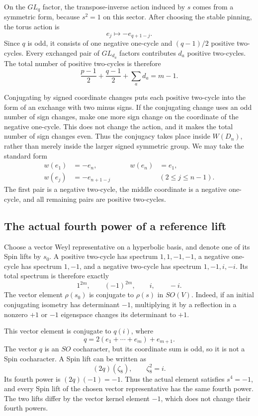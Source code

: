 \documentclass[11pt,a4paper]{article}
\theoremstyle{definition}
\theoremstyle{remark}
\begin{document}
On the \(GL_q\) factor, the transpose-inverse action induced by \(s\)
comes from a symmetric form, because \(s^2=1\) on this sector.
After choosing the stable pinning, the torus action is
\[
e_j\longmapsto-e_{q+1-j}.
\]
Since \(q\) is odd, it consists of one negative one-cycle and
\((q-1)/2\) positive two-cycles.
Every exchanged pair of \(GL_{d_a}\) factors contributes \(d_a\)
positive two-cycles.  The total number of positive two-cycles is
therefore
\[
\frac{p-1}{2}+\frac{q-1}{2}+\sum_a d_a=m-1.
\]

Conjugating by signed coordinate changes puts each positive two-cycle
into the form of an exchange with two minus signs.
If the conjugating change uses an odd number of sign changes, make
one more sign change on the coordinate of the negative one-cycle.
This does not change the action, and it makes the total number of sign
changes even.
Thus the conjugacy takes place inside \(W(D_n)\), rather than merely
inside the larger signed symmetric group.
We may take the standard form
\[
\begin{aligned}
w(e_1)&=-e_n,&\qquad w(e_n)&=e_1,\\
w(e_j)&=-e_{n+1-j}&& (2\leq j\leq n-1).
\end{aligned}
\]
The first pair is a negative two-cycle, the middle coordinate is a
negative one-cycle, and all remaining pairs are positive two-cycles.

\subsection{The actual fourth power of a reference lift}

Choose a vector Weyl representative on a hyperbolic basis, and denote
one of its Spin lifts by \(s_0\).
A positive two-cycle has spectrum \(1,1,-1,-1\), a negative one-cycle
has spectrum \(1,-1\), and a negative two-cycle has spectrum
\(1,-1,i,-i\).
Its total spectrum is therefore exactly
\[
1^{2m},\qquad (-1)^{2m},\qquad i,\qquad -i.
\]
The vector element \(\rho(s_0)\) is conjugate to \(\rho(s)\) in
\(SO(V)\).
Indeed, if an initial conjugating isometry has determinant \(-1\),
multiplying it by a reflection in a nonzero \(+1\) or \(-1\) eigenspace
changes its determinant to \(+1\).

This vector element is conjugate to \(q(i)\), where
\[
q=2(e_1+\cdots+e_m)+e_{m+1}.
\]
The vector \(q\) is an \(SO\) cocharacter, but its coordinate sum is odd,
so it is not a Spin cocharacter.
A Spin lift can be written as
\[
(2q)(\zeta_8),\qquad \zeta_8^2=i.
\]
Its fourth power is \((2q)(-1)=-1\).
Thus the actual element satisfies \(s^4=-1\), and every Spin lift of
the chosen vector representative has the same fourth power.
The two lifts differ by the vector kernel element \(-1\), which does
not change their fourth powers.
\end{document}
